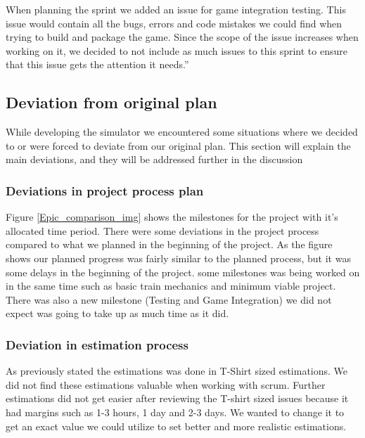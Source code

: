 When planning the sprint we added an issue for game integration testing. This issue would contain all the bugs, errors and code mistakes we could find when trying to build and package the game. Since the scope of the issue increases when working on it, we decided to not include as much issues to this sprint to ensure that this issue gets the attention it needs.”


\subsection{Deviation from original plan} \label{deviation_process}
While developing the simulator we encountered some situations where we decided to or were forced to deviate from our original plan. This section will explain the main deviations, and they will be addressed further in the discussion   

\subsubsection{Deviations in project process plan}
Figure \ref{Epic_comparison_img} shows the milestones for the project with it's allocated time period. There were some deviations in the project process compared to what we planned in the beginning of the project. As the figure shows our planned progress was fairly similar to the planned process, but it was some delays in the beginning of the project. some milestones was being worked on in the same time such as basic train mechanics and minimum viable project. There was also a new milestone (Testing and Game Integration) we did not expect was going to take up as much time as it did.

\subsubsection{Deviation in estimation process}

As previously stated the estimations was done in T-Shirt sized estimations. We did not find these estimations valuable when working with scrum. Further estimations did not get easier after reviewing the T-shirt sized issues because it had margins such as 1-3 hours, 1 day and 2-3 days. We wanted to change it to get an exact value we could utilize to set better and more realistic estimations.

